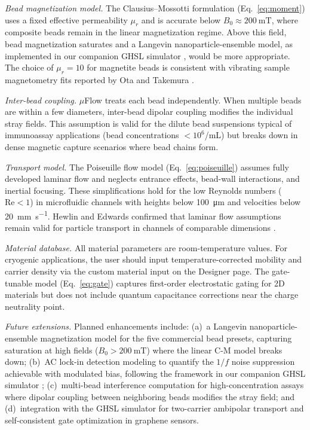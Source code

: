 \documentclass[preprint,review,12pt]{elsarticle}
\begin{document}
\textit{Bead magnetization model.} The Clausius--Mossotti formulation (Eq.~\eqref{eq:moment}) uses a fixed effective permeability $\mu_r$ and is accurate below $B_0 \approx \SI{200}{\milli\tesla}$, where composite beads remain in the linear magnetization regime. Above this field, bead magnetization saturates and a Langevin nanoparticle-ensemble model, as implemented in our companion GHSL simulator \cite{govindaraju2025}, would be more appropriate. The choice of $\mu_r = 10$ for magnetite beads is consistent with vibrating sample magnetometry fits reported by Ota and Takemura \cite{ota2019}.

\textit{Inter-bead coupling.} $\mu$Flow treats each bead independently. When multiple beads are within a few diameters, inter-bead dipolar coupling modifies the individual stray fields. This assumption is valid for the dilute bead suspensions typical of immunoassay applications (bead concentrations $< 10^6$/mL) but breaks down in dense magnetic capture scenarios where bead chains form.

\textit{Transport model.} The Poiseuille flow model (Eq.~\eqref{eq:poiseuille}) assumes fully developed laminar flow and neglects entrance effects, bead-wall interactions, and inertial focusing. These simplifications hold for the low Reynolds numbers ($\text{Re} < 1$) in microfluidic channels with heights below \SI{100}{\micro\meter} and velocities below \SI{20}{\milli\meter\per\second}. Hewlin and Edwards confirmed that laminar flow assumptions remain valid for particle transport in channels of comparable dimensions \cite{hewlin2023}.

\textit{Material database.} All material parameters are room-temperature values. For cryogenic applications, the user should input temperature-corrected mobility and carrier density via the custom material input on the Designer page. The gate-tunable model (Eq.~\eqref{eq:gate}) captures first-order electrostatic gating for 2D materials but does not include quantum capacitance corrections near the charge neutrality point.

\textit{Future extensions.} Planned enhancements include: (a)~a Langevin nanoparticle-ensemble magnetization model for the five commercial bead presets, capturing saturation at high fields ($B_0 > \SI{200}{\milli\tesla}$) where the linear C-M model breaks down; (b)~AC lock-in detection modeling to quantify the $1/f$ noise suppression achievable with modulated bias, following the framework in our companion GHSL simulator \cite{govindaraju2025}; (c)~multi-bead interference computation for high-concentration assays where dipolar coupling between neighboring beads modifies the stray field; and (d)~integration with the GHSL simulator for two-carrier ambipolar transport and self-consistent gate optimization in graphene sensors.
\end{document}
